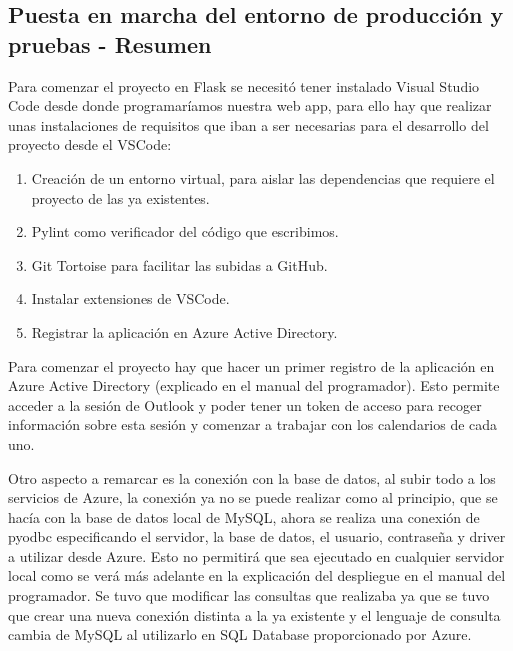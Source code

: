 \subsection{Puesta en marcha del entorno de producción y pruebas - Resumen}
Para comenzar el proyecto en Flask se necesitó tener instalado Visual Studio Code desde donde programaríamos nuestra web app, para ello hay que realizar unas instalaciones de requisitos que iban a ser necesarias para el desarrollo del proyecto desde el VSCode:
\begin{enumerate}
    \item Creación de un entorno virtual, para aislar las dependencias que requiere el proyecto de las ya existentes.
    \item Pylint como verificador del código que escribimos.
    \item Git Tortoise para facilitar las subidas a GitHub.
    \item Instalar extensiones de VSCode.
    \item Registrar la aplicación en Azure Active Directory.
\end{enumerate}
Para comenzar el proyecto hay que hacer un primer registro de la aplicación en Azure Active Directory (explicado en el manual del programador). Esto permite acceder a la sesión de Outlook y poder tener un token de acceso para recoger información sobre esta sesión y comenzar a trabajar con los calendarios de cada uno.\newline


Otro aspecto a remarcar es la conexión con la base de datos, al subir todo a los servicios de Azure, la conexión ya no se puede realizar como al principio, que se hacía con la base de datos local de MySQL, ahora se realiza una conexión de pyodbc especificando el servidor, la base de datos, el usuario, contraseña y driver a utilizar desde Azure. Esto no permitirá que sea ejecutado en cualquier servidor local como se verá más adelante en la explicación del despliegue en el manual del programador. Se tuvo que modificar las consultas que realizaba ya que se tuvo que crear una nueva conexión distinta a la ya existente y el lenguaje de consulta cambia de MySQL al utilizarlo en SQL Database proporcionado por Azure.\newline




